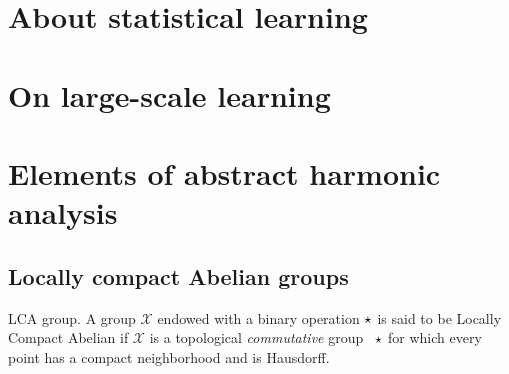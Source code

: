 \section{About statistical learning}
\label{sec:about_statistical_learning}

\section{On large-scale learning}
\label{sec:on_large-scale_learning}

\section{Elements of abstract harmonic analysis}
\label{sec:abstract_harmonic}

\subsection{Locally compact Abelian groups}
\begin{definition}{\acl{LCA} group.}
A group $\mathcal{X}$ endowed with a binary operation $\star$ is said to be Locally Compact Abelian if $\mathcal{X}$ is a topological \emph{commutative} group \wrt~$\star$ for which every point has a compact neighborhood and is Hausdorff.
\end{definition}

